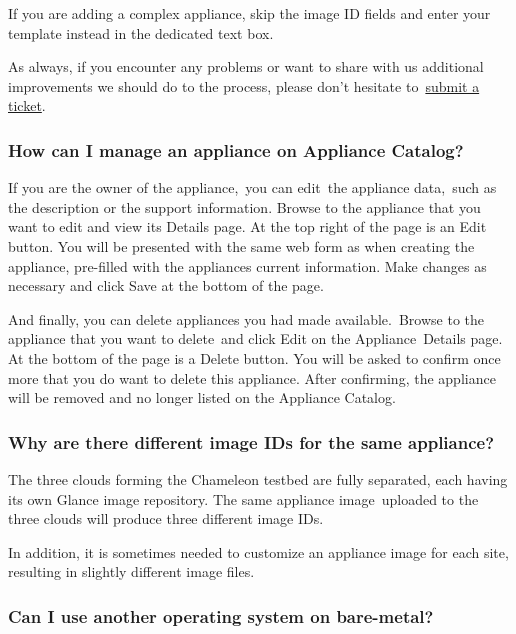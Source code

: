 If you are adding a complex appliance, skip the image ID fields and
enter your template instead in the dedicated text box.

As always, if you encounter any problems or want to share with us
additional improvements we should do to the process, please don't
hesitate to~\href{https://www.chameleoncloud.org/help/}{submit a
ticket}.~

\subsubsection{How can I manage an appliance on Appliance
Catalog?}\label{how-can-i-manage-an-appliance-on-chameleon-appliance-catalog}

If you are the owner of the appliance,~you can edit~the appliance
data,~such as the description or the support information. Browse to the
appliance that you want to edit and view its Details page. At the top
right of the page is an Edit button. You will be presented with the same
web form as when creating the appliance, pre-filled with the appliances
current information. Make changes as necessary and click Save at the
bottom of the page.

And finally, you can delete appliances you had made available.~{Browse
to the appliance that you want to delete~and click Edit on the
Appliance~Details page. At the bottom of the page is a Delete button.
You will be asked to confirm once more that you do want to delete this
appliance}. After confirming, the appliance will be removed and no
longer listed on the Appliance Catalog.

\subsubsection{Why are there different image IDs  for the same
appliance?}\label{why-are-there-different-image-ids-for-kvmtacc-chitacc-and-chiuc-for-the-same-appliance}

The three clouds forming the Chameleon testbed are fully separated, each
having its own Glance image repository. The same appliance
image~uploaded to the three clouds will produce three different image
IDs.

In addition, it is sometimes needed to customize an appliance image for
each site, resulting in slightly different image files.

\subsubsection{Can I use another operating system on bare-metal?}\label{can-i-useubuntudebian-oranother-operating-system-rather-than-centos-on-bare-metal}

